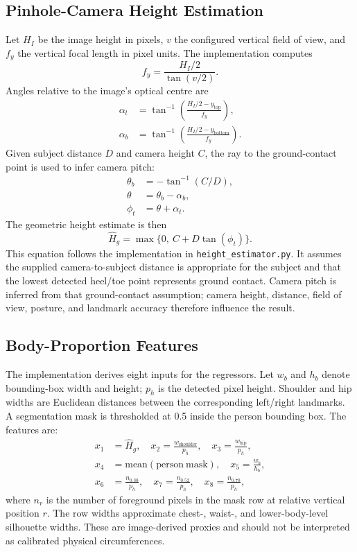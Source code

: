 \documentclass[conference]{IEEEtran}
\begin{document}
\subsection{Pinhole-Camera Height Estimation}
Let $H_I$ be the image height in pixels, $v$ the configured vertical field of view, and $f_y$ the vertical focal length in pixel units. The implementation computes
\begin{equation}
f_y = \frac{H_I/2}{\tan(v/2)}.
\label{eq:focal}
\end{equation}
Angles relative to the image's optical centre are
\begin{align}
\alpha_t &= \tan^{-1}\left(\frac{H_I/2-y_{\mathrm{top}}}{f_y}\right),\\
\alpha_b &= \tan^{-1}\left(\frac{H_I/2-y_{\mathrm{bottom}}}{f_y}\right).
\end{align}
Given subject distance $D$ and camera height $C$, the ray to the ground-contact point is used to infer camera pitch:
\begin{align}
\theta_b &= -\tan^{-1}(C/D),\\
\theta &= \theta_b-\alpha_b,\\
\phi_t &= \theta+\alpha_t.
\end{align}
The geometric height estimate is then
\begin{equation}
\widehat{H}_{g} = \max\{0,\ C+D\tan(\phi_t)\}.
\label{eq:height}
\end{equation}
This equation follows the implementation in \texttt{height\_estimator.py}. It assumes the supplied camera-to-subject distance is appropriate for the subject and that the lowest detected heel/toe point represents ground contact. Camera pitch is inferred from that ground-contact assumption; camera height, distance, field of view, posture, and landmark accuracy therefore influence the result.

\subsection{Body-Proportion Features}
The implementation derives eight inputs for the regressors. Let $w_b$ and $h_b$ denote bounding-box width and height; $p_h$ is the detected pixel height. Shoulder and hip widths are Euclidean distances between the corresponding left/right landmarks. A segmentation mask is thresholded at 0.5 inside the person bounding box. The features are:
\begin{align}
x_1 &= \widehat{H}_{g}, \quad
x_2 = \frac{w_{\mathrm{shoulder}}}{p_h}, \quad
x_3 = \frac{w_{\mathrm{hip}}}{p_h},\\
x_4 &= \mathrm{mean}(\mathrm{person\ mask}), \quad
x_5 = \frac{w_b}{h_b},\\
x_6 &= \frac{n_{0.30}}{p_h}, \quad
x_7 = \frac{n_{0.52}}{p_h}, \quad
x_8 = \frac{n_{0.70}}{p_h},
\end{align}
where $n_r$ is the number of foreground pixels in the mask row at relative vertical position $r$. The row widths approximate chest-, waist-, and lower-body-level silhouette widths. These are image-derived proxies and should not be interpreted as calibrated physical circumferences.
\end{document}
